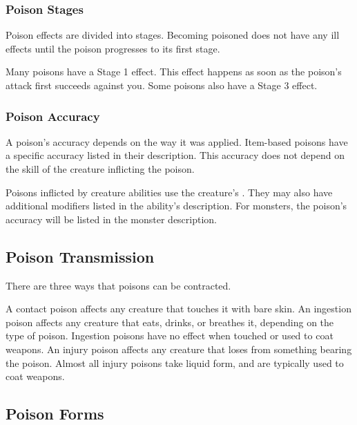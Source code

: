         \subsubsection{Poison Stages}
            Poison effects are divided into stages.
            Becoming poisoned does not have any ill effects until the poison progresses to its first stage.

            Many poisons have a Stage 1 effect.
            This effect happens as soon as the poison's attack first succeeds against you.
            Some poisons also have a Stage 3 effect.

        \subsubsection{Poison Accuracy}
            A poison's accuracy depends on the way it was applied.
            Item-based poisons have a specific accuracy listed in their description.
            This accuracy does not depend on the skill of the creature inflicting the poison.

            Poisons inflicted by creature abilities use the creature's .
            They may also have additional modifiers listed in the ability's description.
            For monsters, the poison's accuracy will be listed in the monster description.

    \subsection{Poison Transmission}\label{Poison Transmission}\label{Transmission}

        There are three ways that poisons can be contracted.

         A contact poison affects any creature that touches it with bare skin.
         An ingestion poison affects any creature that eats, drinks, or breathes it, depending on the type of poison.
        Ingestion poisons have no effect when touched or used to coat weapons.
         An injury poison affects any creature that loses  from something bearing the poison.
        Almost all injury poisons take liquid form, and are typically used to coat weapons.

    \subsection{Poison Forms}\label{Poison Forms}

